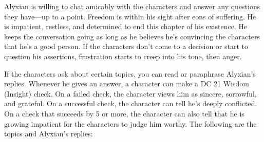 \documentclass[10pt,a4paper,twoside,fancy,bg=print,twocolumn,openany,nodeprecatedcode]{dndbook}
\begin{document}
Alyxian is willing to chat amicably with the characters and answer any questions they have—up to a point. Freedom is within his sight after eons of suffering. He is impatient, restless, and determined to end this chapter of his existence. He keeps the conversation going as long as he believes he's convincing the characters that he's a good person. If the characters don't come to a decision or start to question his assertions, frustration starts to creep into his tone, then anger.

If the characters ask about certain topics, you can read or paraphrase Alyxian's replies. Whenever he gives an answer, a character can make a DC 21 Wisdom (Insight) check. On a failed check, the character views him as sincere, sorrowful, and grateful. On a successful check, the character can tell he's deeply conflicted. On a check that succeeds by 5 or more, the character can also tell that he is growing impatient for the characters to judge him worthy. The following are the topics and Alyxian's replies:
\end{document}
